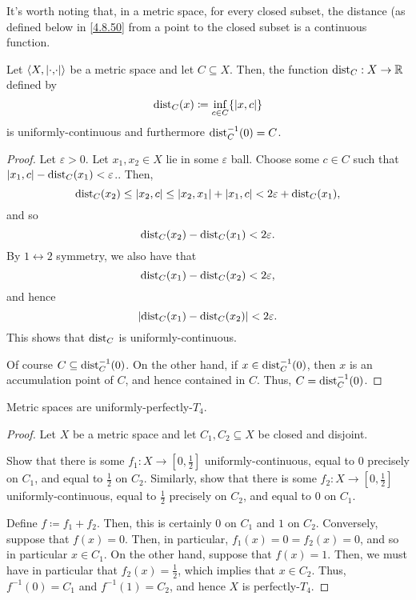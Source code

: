 It's worth noting that, in a metric space, for every closed subset, the distance (as defined below in \eqref{4.8.50} from a point to the closed subset is a continuous function.
\begin{prp}\label{prp4.8.49}
Let $\coord{X,\metric}$ be a metric space and let $C\subseteq X$.  Then, the function $\operatorname{dist} _C:X\rightarrow \mathbb{R}$ defined by
\begin{equation}\label{4.8.50}
\dist _C(x)\coloneqq \inf _{c\in C}\{ \metric[x][c]\} 
\end{equation}
is uniformly-continuous and furthermore $\operatorname{dist} _C^{-1}(0)=C$.
\begin{proof}
Let $\varepsilon >0$.  Let $x_1,x_2\in X$ lie in some $\varepsilon$ ball.  Choose some $c\in C$ such that $\metric[x_1][c]-\dist_C(x_1)<\varepsilon$..  Then,
\begin{equation}
\dist _C(x_2)\leq \metric[x_2][c]\leq \metric[x_2][x_1]+\metric[x_1][c]<2\varepsilon +\dist _C(x_1),
\end{equation}
and so
\begin{equation}
\operatorname{dist} _C(x_2)-\operatorname{dist} _C(x_1)<2\varepsilon .
\end{equation}
By $1\leftrightarrow 2$ symmetry, we also have that
\begin{equation}
\operatorname{dist} _C(x_1)-\operatorname{dist} _C(x_2)<2\varepsilon ,
\end{equation}
and hence
\begin{equation}
\lvert\operatorname{dist} _C(x_1)-\operatorname{dist} _C(x_2)\rvert<2\varepsilon .
\end{equation}
This shows that $\operatorname{dist} _C$ is uniformly-continuous.

Of course $C\subseteq \operatorname{dist} _C^{-1}(0)$.  On the other hand, if $x\in \operatorname{dist} _C^{-1}(0)$, then $x$ is an accumulation point of $C$, and hence contained in $C$.  Thus, $C=\operatorname{dist} _C^{-1}(0)$.
\end{proof}
\end{prp}
\begin{prp}\label{prp5.4.13}
Metric spaces are uniformly-perfectly-$T_4$.
\begin{proof}
Let $X$ be a metric space and let $C_1,C_2\subseteq X$ be closed and disjoint.
\begin{exr}
Show that there is some $f_1:X\rightarrow [0,\frac{1}{2}]$ uniformly-continuous, equal to $0$ precisely on $C_1$, and equal to $\frac{1}{2}$ on $C_2$.  Similarly, show that there is some $f_2:X\rightarrow [0,\frac{1}{2}]$ uniformly-continuous, equal to $\frac{1}{2}$ precisely on $C_2$, and equal to $0$ on $C_1$.
\end{exr}
Define $f\coloneqq f_1+f_2$.  Then, this is certainly $0$ on $C_1$ and $1$ on $C_2$.  Conversely, suppose that $f(x)=0$.  Then, in particular, $f_1(x)=0=f_2(x)=0$, and so in particular $x\in C_1$.  On the other hand, suppose that $f(x)=1$.  Then, we must have in particular that $f_2(x)=\frac{1}{2}$, which implies that $x\in C_2$.  Thus, $f^{-1}(0)=C_1$ and $f^{-1}(1)=C_2$, and hence $X$ is perfectly-$T_4$.
\end{proof}
\end{prp}

